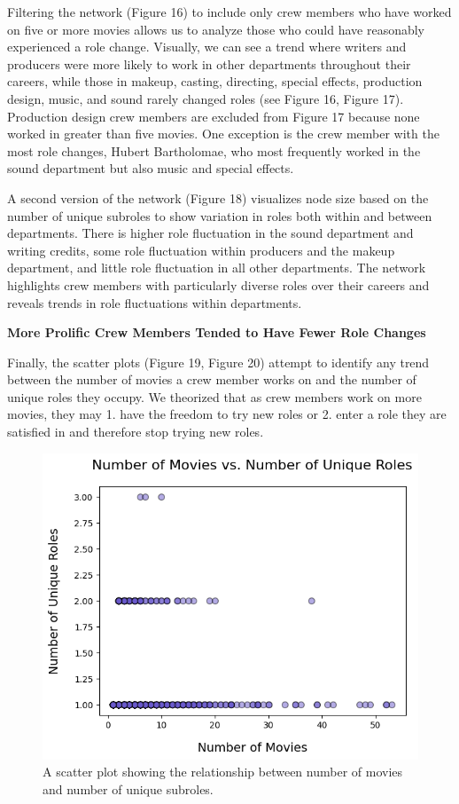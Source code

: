 \documentclass[12pt]{article}
\begin{document}
Filtering the network (Figure 16) to include only crew members who have worked on five or more movies allows us to analyze those who could have reasonably experienced a role change. Visually, we can see a trend where writers and producers were more likely to work in other departments throughout their careers, while those in makeup, casting, directing, special effects, production design, music, and sound rarely changed roles (see Figure 16, Figure 17). Production design crew members are excluded from Figure 17 because none worked in greater than five movies. One exception is the crew member with the most role changes, Hubert Bartholomae, who most frequently worked in the sound department but also music and special effects. 


A second version of the network (Figure 18) visualizes node size based on the number of unique subroles to show variation in roles both within and between departments. There is higher role fluctuation in the sound department and writing credits, some role fluctuation within producers and the makeup department, and little role fluctuation in all other departments. The network highlights crew members with particularly diverse roles over their careers and reveals trends in role fluctuations within departments.

\textbf{More Prolific Crew Members Tended to Have Fewer Role Changes}

Finally, the scatter plots (Figure 19, Figure 20) attempt to identify any trend between the number of movies a crew member works on and the number of unique roles they occupy. We theorized that as crew members work on more movies, they may 1. have the freedom to try new roles or 2. enter a role they are satisfied in and therefore stop trying new roles. 

\begin{figure}[H]
    \centering
    \includegraphics[clip,scale=0.8] {2_scattermoviesroles.png}
    \caption{A scatter plot showing the relationship between number of movies and number of unique subroles.}
    \label{fig:networkfilteredsubroles}
\end{figure}
\end{document}
